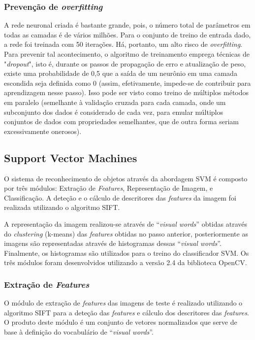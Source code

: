 \documentclass[extendedabs]{vcom}
\begin{document}
\subsubsection{Prevenção de \textit{overfitting}}
A rede neuronal criada é bastante grande, pois, o número total de parâmetros em todas as camadas é de vários milhões. Para o conjunto de treino de entrada dado, a rede foi treinada com 50 iterações. Há, portanto, um alto risco de \textit{overfitting}. Para prevenir tal acontecimento, o algoritmo de treinamento emprega técnicas de "\textit{dropout}", isto é, durante os passos de propagação de erro e atualização de peso, existe uma probabilidade de 0,5 que a saída de um neurônio em uma camada escondida seja definida como 0 (assim, efetivamente, impede-se de contribuir para aprendizagem nesse passo). Isso pode ser visto como treino de múltiplos métodos em paralelo (semelhante à validação cruzada para cada camada, onde um subconjunto dos dados é considerado de cada vez, para emular múltiplos conjuntos de dados com propriedades semelhantes, que de outra forma seriam excessivamente onerosos).

\subsection{Support Vector Machines}
O sistema de reconhecimento de objetos através da abordagem SVM é composto por três módulos: Extração de \textit{Features}, Representação de Imagem, e Classificação. A deteção e o cálculo de descritores das \textit{features} da imagem foi realizada utilizando o algoritmo SIFT. 

A representação da imagem realizou-se através de “\textit{visual words}” obtidas através do \textit{clustering} (k-means) das \textit{features} obtidas no passo anterior, posteriormente as imagens são representadas através de histogramas dessas “\textit{visual words}”. Finalmente, os histogramas são utilizados para o treino do classificador SVM. Os três módulos foram desenvolvidos utilizando a versão 2.4 da biblioteca OpenCV.

\subsubsection{Extração de \textit{Features}}
O módulo de extração de \textit{features} das imagens de teste é realizado utilizando o algoritmo SIFT para a deteção das \textit{features} e cálculo dos descritores das \textit{features}. O produto deste módulo é um conjunto de vetores normalizados que serve de base à definição do vocabulário de “\textit{visual words}”.
\end{document}
